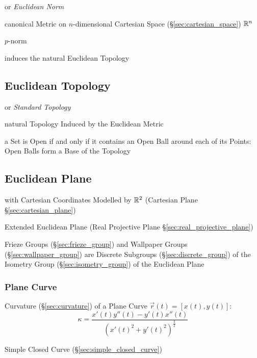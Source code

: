 or \emph{Euclidean Norm}

canonical Metric on $n$-dimensional Cartesian Space
(\S\ref{sec:cartesian_space}) $\mathbb{R}^n$

$p$-norm

induces the natural Euclidean Topology



\subsection{Euclidean Topology}\label{sec:euclidean_topology}

or \emph{Standard Topology}

natural Topology Induced by the Euclidean Metric

a Set is Open if and only if it contains an Open Ball around each of its Points:
Open Balls form a Base of the Topology



\subsection{Euclidean Plane}\label{sec:euclidean_plane}

with Cartesian Coordinates Modelled by $\mathbb{R}^2$ (Cartesian Plane
\S\ref{sec:cartesian_plane})

\fist Extended Euclidean Plane (Real Projective Plane
\S\ref{sec:real_projective_plane})

Frieze Groups (\S\ref{sec:frieze_group}) and Wallpaper Groups
(\S\ref{sec:wallpaper_group}) are Discrete Subgroups
(\S\ref{sec:discrete_group}) of the Isometry Group (\S\ref{sec:isometry_group})
of the Euclidean Plane



\subsubsection{Plane Curve}\label{sec:plane_curve}

Curvature (\S\ref{sec:curvature}) of a Plane Curve $\vec{r}(t) = [x(t),y(t)]$:
\[
  \kappa = \frac{x'(t)y''(t) - y'(t)x''(t)} {(x'(t)^2 + y'(t)^2)^{\frac{3}{2}}}
\]

\fist Simple Closed Curve (\S\ref{sec:simple_closed_curve})



